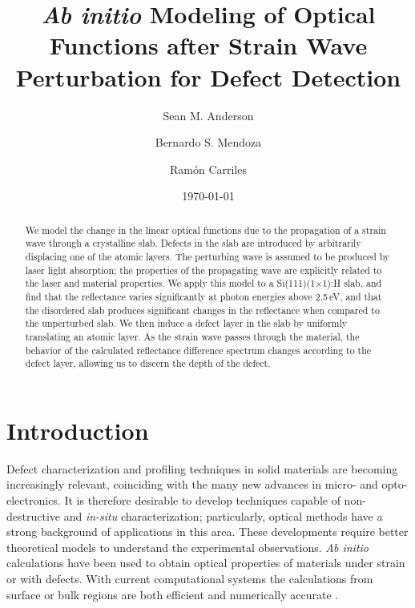 \documentclass[aps,prb,10pt,showkeys,letterpaper,notitlepage,twocolumn]{revtex4-1}
\begin{document}
\title{\emph{Ab initio} Modeling of Optical Functions after Strain Wave
Perturbation for Defect Detection}
\author{Sean M. Anderson}
\author{Bernardo S. Mendoza}%
\author{Ram\'on Carriles}%
\date{\today}

\begin{abstract}
We model the change in the linear optical functions due to the propagation of a
strain wave through a crystalline slab. Defects in the slab are introduced by
arbitrarily displacing one of the atomic layers. The perturbing wave is assumed
to be produced by laser light absorption; the properties of the propagating wave
are explicitly related to the laser and material properties. We apply this model
to a Si(111)(1$\times$1):H slab, and find that the reflectance varies
significantly at photon energies above 2.5\,eV, and that the disordered slab
produces significant changes in the reflectance when compared to the unperturbed
slab. We then induce a defect layer in the slab by uniformly translating an
atomic layer. As the strain wave passes through the material, the behavior of
the calculated reflectance difference spectrum changes according to the defect
layer, allowing us to discern the depth of the defect.
\end{abstract}


\maketitle


\section{Introduction}\label{sec:intro}

Defect characterization and profiling techniques in solid materials are becoming
increasingly relevant, coinciding with the many new advances in micro- and
opto-electronics. It is therefore desirable to develop techniques capable of
non-destructive and \emph{in-situ} characterization; particularly, optical
methods have a strong background of applications in this area. These
developments require better theoretical models to understand the experimental
observations. \emph{Ab initio} calculations have been used to obtain optical
properties of materials under strain or with defects. With current computational
systems the calculations from surface or bulk regions are both efficient and
numerically accurate \cite{hoganPRB98, palummoPRB99, hoganPRB03, mendozaPRB06,
palummoPRB09, hingerlASS01}.
\end{document}
